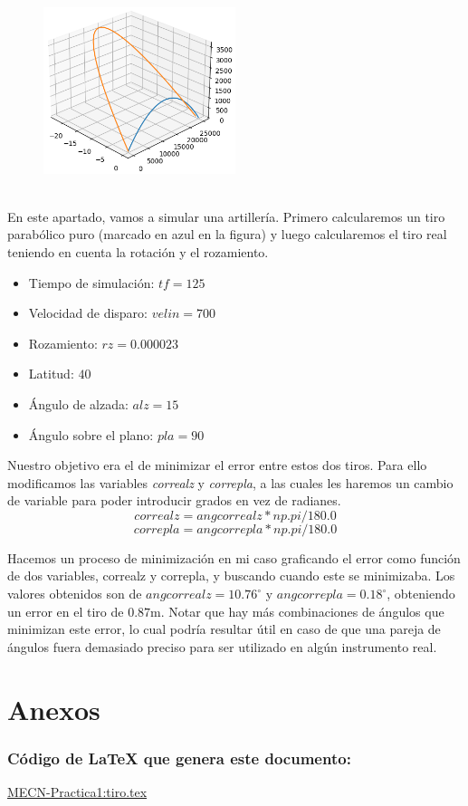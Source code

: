 \documentclass[11pt]{article}
\begin{document}
            \begin{figure}
                \vspace{-0.3cm}
                \centering
                \includegraphics[width=0.5\textwidth]{fotos/gráficas/parabolico.png}
            \end{figure}
            
            \hspace{0cm}\\\noindent En este apartado, vamos a simular una artillería. Primero calcularemos un tiro parabólico puro (marcado en azul en la figura) y luego calcularemos el tiro real teniendo en cuenta la rotación y el rozamiento.
            
            \begin{itemize}
                \item Tiempo de simulación: $tf=125$
                \item Velocidad de disparo: $velin=700$
                \item Rozamiento: $rz=0.000023$
                \item Latitud: $40$
                \item Ángulo de alzada: $alz=15$
                \item Ángulo sobre el plano: $pla=90$
            \end{itemize}
    
            \noindent Nuestro objetivo era el de minimizar el error entre estos dos tiros. Para ello modificamos las variables \textit{correalz} y \textit{correpla}, a las cuales les haremos un cambio de variable para poder introducir grados en vez de radianes.
            \[correalz = angcorrealz*np.pi/180.0\]
            \[correpla = angcorrepla*np.pi/180.0\]
            
            \noindent Hacemos un proceso de minimización en mi caso graficando el error como función de dos variables, correalz y correpla, y buscando cuando este se minimizaba. Los valores obtenidos son de $\textit{angcorrealz} =10.76^\circ$ y 
            $\textit{angcorrepla} =0.18^\circ$, obteniendo un error en el tiro de $0.87$m. Notar que hay más combinaciones de ángulos que minimizan este error, lo cual podría resultar útil en caso de que una pareja de ángulos fuera demasiado preciso para ser utilizado en algún instrumento real.
            
    \section{Anexos}
        \subsubsection*{Código de LaTeX que genera este documento:}
            \href{https://www.overleaf.com/read/qtqqfwwfdtwq#e56287}{MECN-Practica1:tiro.tex}
\end{document}
